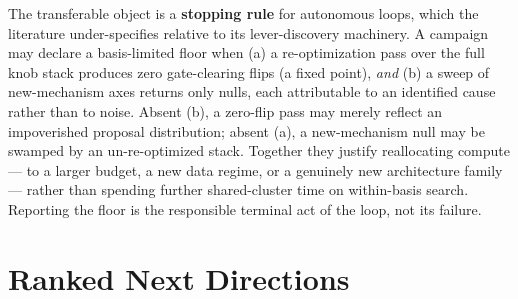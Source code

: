 \documentclass{article}
\begin{document}
The transferable object is a \textbf{stopping rule} for autonomous loops, which the literature under-specifies relative to its lever-discovery machinery. A campaign may declare a basis-limited floor when (a) a re-optimization pass over the full knob stack produces zero gate-clearing flips (a fixed point), \emph{and} (b) a sweep of new-mechanism axes returns only nulls, each attributable to an identified cause rather than to noise. Absent (b), a zero-flip pass may merely reflect an impoverished proposal distribution; absent (a), a new-mechanism null may be swamped by an un-re-optimized stack. Together they justify reallocating compute --- to a larger budget, a new data regime, or a genuinely new architecture family --- rather than spending further shared-cluster time on within-basis search. Reporting the floor is the responsible terminal act of the loop, not its failure.

\section{Ranked Next Directions}
\label{sec:directions}
\end{document}
